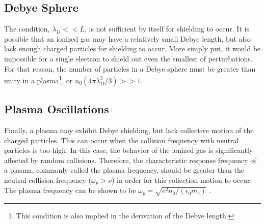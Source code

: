 \subsection{Debye Sphere}
The condition, $\lambda_D << L$, is not sufficient by itself for shielding to
occur. It is possible that an ionized gas may have a relatively small Debye
length, but also lack enough charged particles for shielding to occur. More
simply put, it would be impossible for a single electron to shield out even the
smallest of perturbations. For that reason, the number of particles in a Debye
sphere must be greater than unity in a plasma\footnote{This condition is also
implied in the derivation of the Debye length.}, or $n_0(4\pi \lambda_D^3/3) >>
1$.

\subsection{Plasma Oscillations}
Finally, a plasma may exhibit Debye shielding, but lack collective motion of the
charged particles. This can occur when the collision frequency with neutral
particles is too high. In this case, the behavior of the ionized gas is
significantly affected by random collisions. Therefore, the characteristic
response frequency of a plasma, commonly called the plasma frequency, should be
greater than the neutral collision frequency ({$\omega_p > \nu$}) in order for
this collection motion to occur. The plasma frequency can be shown to be
$\omega_p = \sqrt{e^2n_0/(\epsilon_0 m_e)}$ \cite{Chen1984}.

